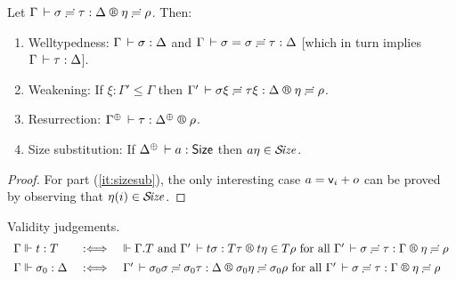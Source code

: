 \documentclass[acmlarge,review,anonymous]{acmart}\settopmatter{printfolios=true}
\begin{document}
\begin{lemma}
  \label{lem:wklrsub}
  Let $\LRSub \Gamma \sigma \tau \Delta \eta \rho$. Then:
  \begin{enumerate}
  \item Welltypedness: $\Gamma \,\vdash \sigma : \Delta$
   and $\Gamma \,\vdash \sigma = \sigma \risingdotseq \tau : \Delta$
   [which in turn implies $\Gamma \,\vdash \tau : \Delta$].
  \item Weakening:
  If $\xi : \Gamma' \leq \Gamma$ then
  $\LRSub{\Gamma'}{\sigma\xi}{\tau\xi}{\Delta}\eta\rho$.
  \item Resurrection:
  $\LRS {\resurrect\Gamma} \tau {\resurrect\Delta} \rho$.
  \item \label{it:sizesub} Size substitution:
  If $\resurrect\Delta \der a : \Size$ then $a\eta \in \mathcal{S}\!\mathit{ize}$.
  \end{enumerate}
\end{lemma}
\begin{proof}
  For part (\ref{it:sizesub}), the only interesting case $a = \mathsf{v}_{i} + o$ can be proved by observing that $\eta(i) \in \mathcal{S}\!\mathit{ize}$.
\end{proof}


Validity judgements.
\[
\begin{array}{l@{\quad}l@{\quad}l}
  \Gamma \valid t : T & \defas & %
    \valid \cext \Gamma T \mand
    \LR {\Gamma'} {t \sigma} {T \tau} {t \eta} {T \rho}
    \mforall \LRSub {\Gamma'} \sigma \tau \Gamma \eta \rho
\\[1ex]
  \Gamma \valid \sigma_0 : \Delta & \defas &
    \LRSub {\Gamma'} {\sigma_0 \sigma} {\sigma_0 \tau} \Delta {\sigma_0 \eta} {\sigma_0 \rho}
    \mforall \LRSub {\Gamma'} {\sigma} {\tau} \Gamma {\eta} {\rho}
\end{array}
\]
\end{document}

